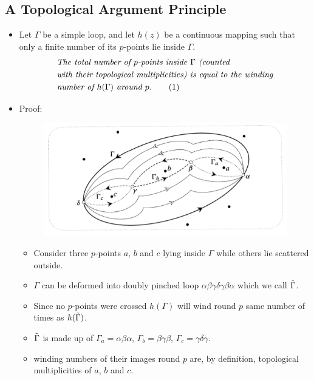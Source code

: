 \documentclass[12pt]{article}
\newcommand\numberthis{\addtocounter{equation}{1}\tag{\theequation}}
\def\tt{\textit}
\def\td{\ensuremath\tilde}
\begin{document}
\subsection{A Topological Argument Principle}
\begin{itemize}
    \item Let $\Gamma$ be a simple loop, and let $h(z)$ be a continuous mapping such that only a finite number of its $p$-points lie inside $\Gamma$.
    \begin{align*}
        &\tt{The total number of $p$-points inside $\Gamma$ (counted }\\
        &\tt{with their topological multiplicities) is equal to the winding}\\
        &\tt{number of $h(\Gamma)$ around $p$.} \numberthis \label{e12}
    \end{align*}
    \item Proof:
    \begin{figure}[h!]
        \centering
        \includegraphics[scale=0.7]{fig_7}
        \label{f7}
    \end{figure}
    \begin{itemize}
        \item Consider three $p$-points $a$, $b$ and $c$ lying inside $\Gamma$ while others lie scattered outside.
        \item $\Gamma$ can be deformed into doubly pinched loop $\alpha\beta\gamma\delta\gamma\beta\alpha$ which we call $\td{\Gamma}$.
        \item Since no $p$-points were crossed $h(\Gamma)$ will wind round $p$ same number of times as $h(\td{\Gamma})$.
        \item $\td{\Gamma}$ is made up of $\Gamma_a=\alpha\beta\alpha$, $\Gamma_b=\beta\gamma\beta$, $\Gamma_c = \gamma\delta\gamma$.
        \item winding numbers of their images round $p$ are, by definition, topological multiplicities of $a$, $b$ and $c$.

\end{itemize}
\end{itemize}
\end{document}
